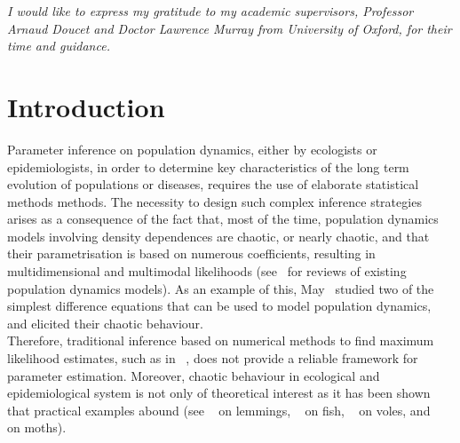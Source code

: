 \documentclass[12pt]{article}
\begin{document}
	\newpage
	\vspace*{80mm}
		\textit{I would like to express my gratitude to my academic supervisors, Professor Arnaud Doucet and Doctor Lawrence Murray from University of Oxford, for their time and guidance.}
	
	\newpage
	
	{\hypersetup{hidelinks}
	\listoffigures
	}
	\clearpage
	{\hypersetup{hidelinks}
	\listoftables
	}
	\clearpage
	{\hypersetup{hidelinks}
		\tableofcontents
	}
	
	\clearpage
	\section{Introduction}
	Parameter inference on population dynamics, either by ecologists or epidemiologists, in order to determine key characteristics of the long term evolution of populations or diseases, requires the use of elaborate statistical methods methods. The necessity to design such complex inference strategies arises as a consequence of the fact that, most of the time, population dynamics models involving density dependences are chaotic, or nearly chaotic, and that their parametrisation is based on numerous coefficients, resulting in multidimensional and multimodal likelihoods (see~\cite{hanski1990density, woiwod1992patterns, turchin2003complex, brook2006strength} for reviews of existing population dynamics models). As an example of this, May~\cite{may1975biological} studied two of the  simplest difference equations that can be used to model population dynamics, and elicited their chaotic behaviour. \\
	Therefore, traditional inference based on numerical methods to find maximum likelihood estimates, such as in ~\cite{kendall1999populations, de2002fitting, valpine2005state, yang2008importance}, does not provide a reliable framework for parameter estimation. Moreover, chaotic behaviour in ecological and epidemiological system is not only of theoretical interest as it has been shown that practical examples abound (see ~\cite{kausrud2008linking} on lemmings, ~\cite{anderson2008fishing} on fish, ~\cite{turchin2000living} on voles, and ~\cite{kendall2005population} on moths).
\end{document}
